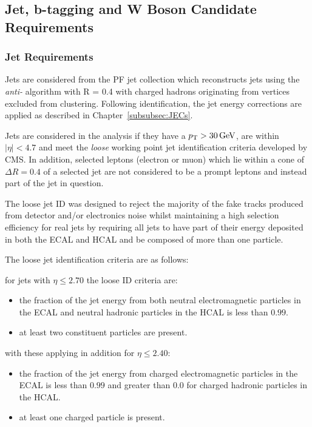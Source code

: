 \subsection{Jet, b-tagging and W Boson Candidate Requirements}
\subsubsection{Jet Requirements}
Jets are considered from the PF jet collection which reconstructs jets using the \emph{anti-\kt} algorithm with R = 0.4 with charged hadrons originating from \PU vertices excluded from clustering.
Following identification, the jet energy corrections are applied as described in Chapter~\ref{subsubsec:JECs}.

Jets are considered in the analysis if they have a $p_{\mathrm{T}} > 30\,\text{Ge\hspace{-.08em}V}$, are within $|\eta| < 4.7$ and meet the \emph{loose} working point jet identification criteria developed by CMS.
In addition, selected leptons (electron or muon) which lie within a cone of $\Delta R = 0.4$ of a selected jet are not considered to be a prompt leptons and instead part of the jet in question.

The loose jet ID was designed to reject the majority of the fake tracks produced from detector and/or electronics noise whilst maintaining a high selection efficiency for real jets by requiring all jets to have part of their energy deposited in both the ECAL and HCAL and be composed of more than one particle.

The loose jet identification criteria are as follows:

for jets with $\eta \leq 2.70$ the loose ID criteria are:
\begin{itemize}
\item the fraction of the jet energy from both neutral electromagnetic particles in the ECAL and neutral hadronic particles in the HCAL is less than $0.99$.
\item at least two constituent particles are present.
\end{itemize}

with these applying in addition for $\eta \leq 2.40$:
\begin{itemize}
\item the fraction of the jet energy from charged electromagnetic particles in the ECAL is less than $0.99$ and greater than 0.0 for charged hadronic particles in the HCAL.
\item at least one charged particle is present.
\end{itemize}



